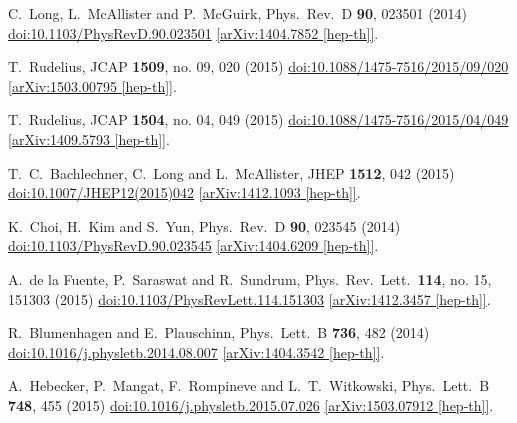 \documentclass[12pt]{article}
\begin{document}
\begin{thebibliography}{99}
  C.~Long, L.~McAllister and P.~McGuirk,
  Phys.\ Rev.\ D {\bf 90}, 023501 (2014)
  \href{https://dx.doi.org/10.1103/PhysRevD.90.023501}{doi:10.1103/PhysRevD.90.023501}
  \href{https://arxiv.org/abs/1404.7852}{[arXiv:1404.7852 [hep-th]]}.

  T.~Rudelius,
  JCAP {\bf 1509}, no. 09, 020 (2015)
  \href{https://dx.doi.org/10.1088/1475-7516/2015/09/020}{doi:10.1088/1475-7516/2015/09/020}
  \href{https://arxiv.org/abs/1503.00795}{[arXiv:1503.00795 [hep-th]]}.

  T.~Rudelius,
  JCAP {\bf 1504}, no. 04, 049 (2015)
  \href{https://dx.doi.org/10.1088/1475-7516/2015/04/049}{doi:10.1088/1475-7516/2015/04/049}
  \href{https://arxiv.org/abs/1409.5793}{[arXiv:1409.5793 [hep-th]]}.

  T.~C.~Bachlechner, C.~Long and L.~McAllister,
  JHEP {\bf 1512}, 042 (2015)
  \href{https://dx.doi.org/10.1007/JHEP12(2015)042}{doi:10.1007/JHEP12(2015)042}
  \href{https://arxiv.org/abs/1412.1093}{[arXiv:1412.1093 [hep-th]]}.

  K.~Choi, H.~Kim and S.~Yun,
  Phys.\ Rev.\ D {\bf 90}, 023545 (2014)
  \href{https://dx.doi.org/10.1103/PhysRevD.90.023545}{doi:10.1103/PhysRevD.90.023545}
  \href{https://arxiv.org/abs/1404.6209}{[arXiv:1404.6209 [hep-th]]}.

  A.~de la Fuente, P.~Saraswat and R.~Sundrum,
  Phys.\ Rev.\ Lett.\  {\bf 114}, no. 15, 151303 (2015)
  \href{https://dx.doi.org/10.1103/PhysRevLett.114.151303}{doi:10.1103/PhysRevLett.114.151303}
  \href{https://arxiv.org/abs/1412.3457}{[arXiv:1412.3457 [hep-th]]}.

  R.~Blumenhagen and E.~Plauschinn,
  Phys.\ Lett.\ B {\bf 736}, 482 (2014)
  \href{https://dx.doi.org/10.1016/j.physletb.2014.08.007}{doi:10.1016/j.physletb.2014.08.007}
  \href{https://arxiv.org/abs/1404.3542}{[arXiv:1404.3542 [hep-th]]}.

  A.~Hebecker, P.~Mangat, F.~Rompineve and L.~T.~Witkowski,
  Phys.\ Lett.\ B {\bf 748}, 455 (2015)
  \href{https://dx.doi.org/10.1016/j.physletb.2015.07.026}{doi:10.1016/j.physletb.2015.07.026}
  \href{https://arxiv.org/abs/1503.07912}{[arXiv:1503.07912 [hep-th]]}.


\end{thebibliography}
\end{document}

